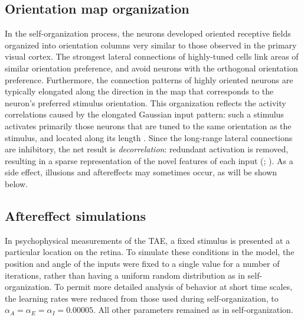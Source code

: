\documentclass[10pt]{article}   %
\begin{document}
\subsection{Orientation map organization}

In the self-organization process, the neurons developed oriented
receptive fields organized into orientation columns very similar to
those observed in the primary visual cortex.
The strongest lateral connections of highly-tuned cells 
link areas of similar orientation preference, and avoid neurons with
the orthogonal orientation preference.
Furthermore, the connection patterns of highly oriented neurons are
typically elongated along the direction in the map that corresponds to
the neuron's preferred stimulus orientation. This organization
reflects the activity correlations caused by the elongated Gaussian
input pattern: such a stimulus activates primarily those neurons that
are tuned to the same orientation as the stimulus, and located along
its length \cite*{sirosh:htmlbook96-article}.
Since the long-range lateral connections are inhibitory, the net
result is {\em decorrelation\/}: redundant activation is removed,
resulting in a sparse representation of the novel features of each
input (;
). 
As a side effect, illusions and aftereffects may sometimes occur, as
will be shown below.


\subsection{Aftereffect simulations}

In psychophysical measurements of the TAE, a fixed stimulus is
presented at a particular location on the retina.  To simulate these
conditions in the model, the position and angle of the inputs were
fixed to a single value for a number of iterations, rather than having
a uniform random distribution as in self-organization.  To permit more
detailed analysis of behavior at short time scales, the learning rates
were reduced from those used during self-organization, to
$\alpha_A=\alpha_E=\alpha_I=0.00005$.  All other parameters remained
as in self-organization.
\end{document}
